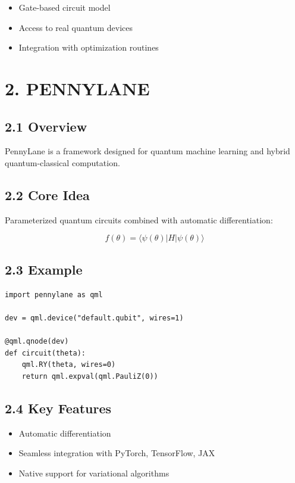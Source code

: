 \begin{itemize}
\item Gate-based circuit model
\item Access to real quantum devices
\item Integration with optimization routines
\end{itemize}

\vspace{0.5cm}

\section*{2. PENNYLANE}

\subsection*{2.1 Overview}

PennyLane is a framework designed for quantum machine learning and hybrid quantum-classical computation.

\subsection*{2.2 Core Idea}

Parameterized quantum circuits combined with automatic differentiation:

\[
f(\theta) = \langle \psi(\theta) | H | \psi(\theta) \rangle
\]

\subsection*{2.3 Example}

\begin{verbatim}
import pennylane as qml

dev = qml.device("default.qubit", wires=1)

@qml.qnode(dev)
def circuit(theta):
    qml.RY(theta, wires=0)
    return qml.expval(qml.PauliZ(0))
\end{verbatim}

\subsection*{2.4 Key Features}

\begin{itemize}
\item Automatic differentiation
\item Seamless integration with PyTorch, TensorFlow, JAX
\item Native support for variational algorithms
\end{itemize}

